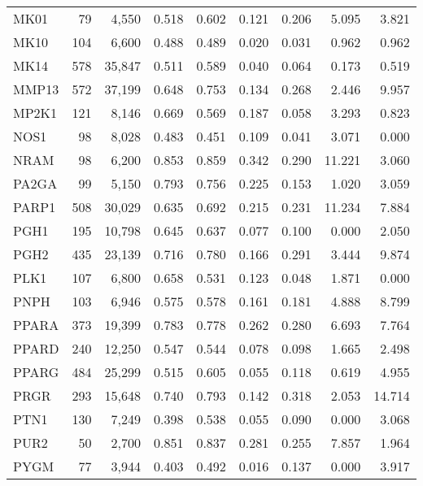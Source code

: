 \begin{center}
\begin{longtable}{lrrrrrrrr}
			MK01   & 79    & 4,550    & 0.518   & 0.602   & 0.121   & 0.206   & 5.095   & 3.821  \\
			MK10   & 104   & 6,600    & 0.488   & 0.489   & 0.020   & 0.031   & 0.962   & 0.962  \\
			MK14   & 578   & 35,847   & 0.511   & 0.589   & 0.040   & 0.064   & 0.173   & 0.519  \\
			MMP13  & 572   & 37,199   & 0.648   & 0.753   & 0.134   & 0.268   & 2.446   & 9.957  \\
			MP2K1  & 121   & 8,146    & 0.669   & 0.569   & 0.187   & 0.058   & 3.293   & 0.823  \\
			NOS1   & 98    & 8,028    & 0.483   & 0.451   & 0.109   & 0.041   & 3.071   & 0.000  \\
			NRAM   & 98    & 6,200    & 0.853   & 0.859   & 0.342   & 0.290   & 11.221  & 3.060  \\
			PA2GA  & 99    & 5,150    & 0.793   & 0.756   & 0.225   & 0.153   & 1.020   & 3.059  \\
			PARP1  & 508   & 30,029   & 0.635   & 0.692   & 0.215   & 0.231   & 11.234  & 7.884  \\
			PGH1   & 195   & 10,798   & 0.645   & 0.637   & 0.077   & 0.100   & 0.000   & 2.050  \\
			PGH2   & 435   & 23,139   & 0.716   & 0.780   & 0.166   & 0.291   & 3.444   & 9.874  \\
			PLK1   & 107   & 6,800    & 0.658   & 0.531   & 0.123   & 0.048   & 1.871   & 0.000  \\
			PNPH   & 103   & 6,946    & 0.575   & 0.578   & 0.161   & 0.181   & 4.888   & 8.799  \\
			PPARA  & 373   & 19,399   & 0.783   & 0.778   & 0.262   & 0.280   & 6.693   & 7.764  \\
			PPARD  & 240   & 12,250   & 0.547   & 0.544   & 0.078   & 0.098   & 1.665   & 2.498  \\
			PPARG  & 484   & 25,299   & 0.515   & 0.605   & 0.055   & 0.118   & 0.619   & 4.955  \\
			PRGR   & 293   & 15,648   & 0.740   & 0.793   & 0.142   & 0.318   & 2.053   & 14.714 \\
			PTN1   & 130   & 7,249    & 0.398   & 0.538   & 0.055   & 0.090   & 0.000   & 3.068  \\
			PUR2   & 50    & 2,700    & 0.851   & 0.837   & 0.281   & 0.255   & 7.857   & 1.964  \\
			PYGM   & 77    & 3,944    & 0.403   & 0.492   & 0.016   & 0.137   & 0.000   & 3.917  \\

\end{longtable}
\end{center}
